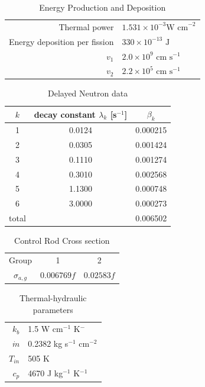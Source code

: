 \documentclass{proposal}
\begin{document}
\begin{table}
    \centering
    \caption{Energy Production and Deposition}\label{tab:test1-energy}
    \begin{tabular}{r|l}
        Thermal power & $1.531 \times 10^{-3}\text{W cm}^{-2}$\\
        Energy deposition per fission & $330 \times 10^{-13}\text{ J}$\\
        $v_1$ & $2.0\times 10^9 \text{ cm s}^{-1}$\\
        $v_2$ & $2.2\times 10^5 \text{ cm s}^{-1}$
    \end{tabular}
\end{table}

\begin{table}
    \centering
    \caption{Delayed Neutron data}\label{tab:test1-delayed-neutrons}
    \begin{tabular}{c|c|c}
        $k$ & decay constant $\lambda_k$ [s$^{-1}$] & $\beta_k$\\
        \hline\hline
        1  &  0.0124  & 0.000215\\
        2  &  0.0305  & 0.001424\\
        3  &  0.1110  & 0.001274\\
        4  &  0.3010  & 0.002568\\
        5  &  1.1300  & 0.000748\\
        6  &  3.0000  & 0.000273\\
        \hline
        total &       & 0.006502
    \end{tabular}
\end{table}

\begin{table}
    \centering
    \caption{Control Rod Cross section}\label{tab:test1-xs}
    \begin{tabular}{c|c|c}
        Group & 1 & 2\\
        $\sigma_{a, g}$ & $0.006769 f$ & $0.02583 f$ 
    \end{tabular}
\end{table}

\begin{table}
    \centering
    \caption{Thermal-hydraulic parameters}\label{tab:test1-th}
    \begin{tabular}{r|l}
        $k_b$ & 1.5 W cm$^{-1}$ K$^{-}$\\
        $\dot{m}$ & 0.2382 kg s$^{-1}$ cm$^{-2}$\\
        $T_{in}$ & 505 K \\
        $c_p$ & 4670 J kg$^{-1}$ K$^{-1}$ \\
    \end{tabular}
\end{table}
\end{document}
